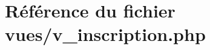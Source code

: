 \hypertarget{v__inscription_8php}{}\section{Référence du fichier vues/v\+\_\+inscription.php}
\label{v__inscription_8php}

